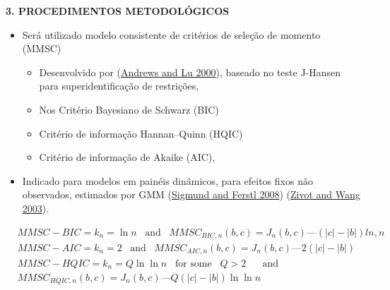 \documentclass[
  ignorenonframetext,
  aspectratio=169,
  ignorenonframetext]{beamer}
\providecommand{\tightlist}{%
  \setlength{\itemsep}{0pt}\setlength{\parskip}{0pt}}
\begin{document}
\begin{frame}{\textbf{3. PROCEDIMENTOS METODOLÓGICOS}}
\protect\hypertarget{procedimentos-metodoluxf3gicos-10}{}
\begin{itemize}
\tightlist
\item
  Será utilizado modelo consistente de critérios de seleção de momento
  (MMSC)

  \begin{itemize}
  \tightlist
  \item
    Desenvolvido por (\protect\hyperlink{ref-andrews-lu:2001}{Andrews
    and Lu 2000}), baseado no teste J-Hansen para superidentificação de
    restrições,
  \item
    Nos Critério Bayesiano de Schwarz (BIC)
  \item
    Critério de informação Hannan--Quinn (HQIC)
  \item
    Critério de informação de Akaike (AIC),\\
  \end{itemize}
\item
  Indicado para modelos em painéis dinâmicos, para efeitos fixos não
  observados, estimados por GMM
  (\protect\hyperlink{ref-sigmund:2008}{Sigmund and Ferstl 2008})
  (\protect\hyperlink{ref-zivotwang:2003}{Zivot and Wang 2003}).
\end{itemize}

\begin{equation}\label{eq:andrewslu}
\begin{aligned}{}
& MMSC-BIC = k_{n} = \ln n \hspace{10pt} \text{and} \hspace{10pt} MMSC_{BIC,n}(b,c) = J_{n}(b,c) — (|c| - |b| )ln,n \\
& MMSC-AIC = k_{n} = 2 \hspace{10pt} \text{and} \hspace{10pt} 
MMSC_{AIC,n}(b,c) = J_{n}(b,c) — 2(|c| - |b| ) \\
& MMSC-HQIC = k_{n} = Q \ln \ln n  \hspace{10pt} \text{for some} \hspace{10pt} Q > 2 \hspace{10pt} \hspace{10pt} \text{and} \hspace{10pt}  \\
& MMSC_{HQIC,n}(b,c) = J_{n}(b,c) — Q(|c| - |b|)\ln\ln n
\end{aligned}
\end{equation}
\end{frame}
\end{document}
